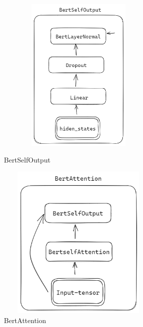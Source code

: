 \documentclass[a4paper]{article}
\begin{document}
\begin{sloppypar}
      \begin{figure}[H]
            \centering
            \begin{minipage}{0.49\linewidth}
                  \centering
                  \includegraphics[width=3.15in,height=3.0in]{BertOutput}
                  \caption{BertSelfOutput}
                  \label{BertSelfOutput}%
            \end{minipage}
            \begin{minipage}{0.49\linewidth}
                  \centering
                  \includegraphics[width=3.15in,height=3.0in]{BertAttention}
                  \caption{BertAttention}
                  \label{BertAttention}%
            \end{minipage}

      \end{figure}


\end{sloppypar}
\end{document}
